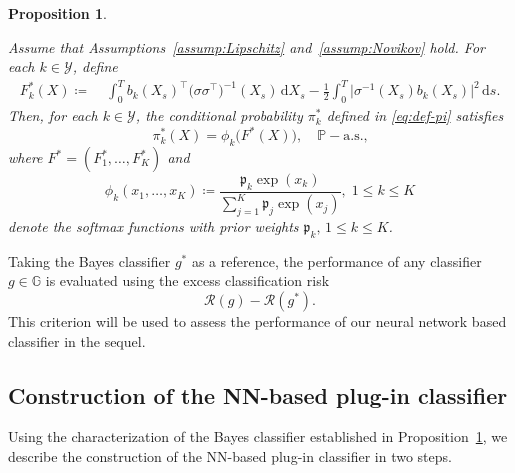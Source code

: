 \documentclass{article}
\theoremstyle{plain}
\newtheorem{proposition}[theorem]{Proposition}
\theoremstyle{definition}
\theoremstyle{remark}
\renewcommand{\d}{\mathrm{d}}
\newcommand{\PP}{\mathbb{P}}
\newcommand{\calR}{\mathcal{R}}
\newcommand{\rr}{\color{red}}
\newcommand{\black}{\color{black}}
\begin{document}
\begin{proposition}\label{prop:bayes-classifier} 

Assume that Assumptions~\ref{assump:Lipschitz} and~\ref{assump:Novikov} hold.
For each $k \in \mathcal{Y}$, define
\begin{align}\label{eq:def-F}
F_k^*(X)
\coloneqq\;
&\int_{0}^{T} b_k(X_s)^{\top} \big(\sigma\sigma^{\top}\big)^{-1}(X_s)\,\d X_s -\frac{1}{2}\int_{0}^{T} \big\lvert \sigma^{-1}(X_s) b_k(X_s) \big\rvert^2 \,\d s .
\end{align}
Then, for each $k \in \mathcal{Y}$, the conditional probability $\pi_k^*$ defined in \eqref{eq:def-pi} satisfies
\begin{equation}\label{eq:pi-equality}
\pi_k^*(X) = \phi_k\big( F^*(X) \big), \quad \PP-\text{a.s.,}
\end{equation}
where $F^* = (F_1^*, \dots, F_K^*)$ and
\begin{equation}\label{eq:def-phi}
\phi_k(x_1,\dots,x_K)
\coloneqq
\frac{\mathfrak{p}_k \exp(x_k)}{\sum_{j=1}^{K} \mathfrak{p}_j \exp(x_j)}, \;1\leq k\leq K  
\end{equation}
denote the softmax functions with prior weights $\mathfrak{p}_k, \,1\leq k\leq K$.
\end{proposition}
Taking the Bayes classifier $g^*$ as a reference, the performance of any classifier $g\in\mathbb{G}$ is evaluated using the excess classification risk 
\begin{equation}\label{eq:def-excess classification risk}
   \calR(g)-\calR(g^*). 
\end{equation} This criterion will be used to assess the performance of our neural network based classifier in the sequel.



\subsection{Construction of the NN-based plug-in classifier}\label{subsec:construction-nn-classifier}

Using the characterization of the Bayes classifier established in Proposition~\ref{prop:bayes-classifier}, we describe the construction of the NN-based plug-in classifier in two steps.
\end{document}
